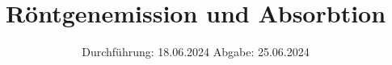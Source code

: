 

\subject{V602}
\title{Röntgenemission und Absorbtion}
\date{%
  Durchführung: 18.06.2024
  \hspace{3em}
  Abgabe: 25.06.2024
}



\maketitle
\thispagestyle{empty}
\tableofcontents
\newpage






\printbibliography{}


